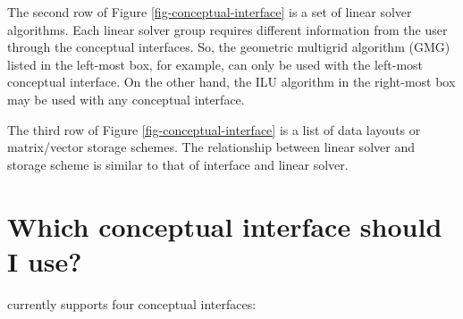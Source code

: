 The second row of Figure \ref{fig-conceptual-interface} is a set of
linear solver algorithms.  Each linear solver group requires different
information from the user through the conceptual interfaces.  So, the
geometric multigrid algorithm (GMG) listed in the left-most box, for
example, can only be used with the left-most conceptual interface.  On
the other hand, the ILU algorithm in the right-most box may be used
with any conceptual interface.

The third row of Figure \ref{fig-conceptual-interface} is a list of
data layouts or matrix/vector storage schemes.  The relationship
between linear solver and storage scheme is similar to that of
interface and linear solver.


\section{Which conceptual interface should I use?}
\label{Which conceptual interface should I use}

\hypre{} currently supports four conceptual interfaces:

